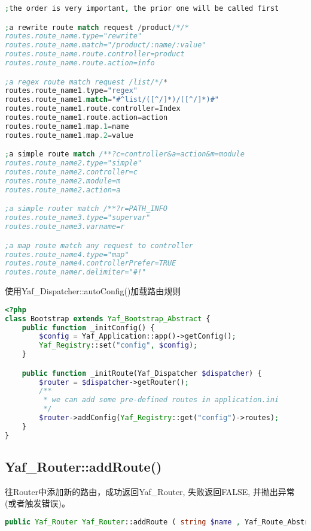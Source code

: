 \begin{lstlisting}[language=PHP]
;the order is very important, the prior one will be called first

;a rewrite route match request /product/*/*
routes.route_name.type="rewrite"
routes.route_name.match="/product/:name/:value"
routes.route_name.route.controller=product
routes.route_name.route.action=info

;a regex route match request /list/*/*
routes.route_name1.type="regex"
routes.route_name1.match="#^list/([^/]*)/([^/]*)#"
routes.route_name1.route.controller=Index
routes.route_name1.route.action=action
routes.route_name1.map.1=name
routes.route_name1.map.2=value

;a simple route match /**?c=controller&a=action&m=module
routes.route_name2.type="simple"
routes.route_name2.controller=c
routes.route_name2.module=m
routes.route_name2.action=a

;a simple router match /**?r=PATH_INFO
routes.route_name3.type="supervar"
routes.route_name3.varname=r

;a map route match any request to controller
routes.route_name4.type="map"
routes.route_name4.controllerPrefer=TRUE
routes.route_namer.delimiter="#!"
\end{lstlisting}

\begin{example}
使用Yaf\_Dispatcher::autoConfig()加载路由规则
\begin{lstlisting}[language=PHP]
<?php
class Bootstrap extends Yaf_Bootstrap_Abstract {
    public function _initConfig() {
        $config = Yaf_Application::app()->getConfig();
        Yaf_Registry::set("config", $config);
    }

    public function _initRoute(Yaf_Dispatcher $dispatcher) {
        $router = $dispatcher->getRouter();
        /**
         * we can add some pre-defined routes in application.ini
         */
        $router->addConfig(Yaf_Registry::get("config")->routes);
    }
}
\end{lstlisting}
\end{example}




\subsection{Yaf\_Router::addRoute()}

往Router中添加新的路由，成功返回Yaf\_Router, 失败返回FALSE, 并抛出异常(或者触发错误)。


\begin{lstlisting}[language=PHP]
public Yaf_Router Yaf_Router::addRoute ( string $name , Yaf_Route_Abstract $route )
\end{lstlisting}

